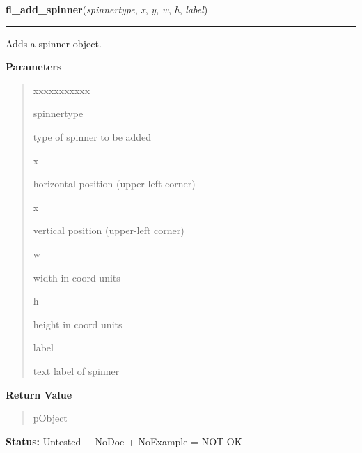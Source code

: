     \label{xformslib:library:fl_add_spinner}

    \vspace{0.5ex}

\hspace{.8\funcindent}\begin{boxedminipage}{\funcwidth}

    \raggedright \textbf{fl\_add\_spinner}(\textit{spinnertype}, \textit{x}, \textit{y}, \textit{w}, \textit{h}, \textit{label})

    \vspace{-1.5ex}

    \rule{\textwidth}{0.5\fboxrule}
\setlength{\parskip}{2ex}
    Adds a spinner object.

\setlength{\parskip}{1ex}
      \textbf{Parameters}
      \vspace{-1ex}

      \begin{quote}
        \begin{Ventry}{xxxxxxxxxxx}

          \item[spinnertype]

          type of spinner to be added

          \item[x]

          horizontal position (upper-left corner)

          \item[x]

          vertical position (upper-left corner)

          \item[w]

          width in coord units

          \item[h]

          height in coord units

          \item[label]

          text label of spinner

        \end{Ventry}

      \end{quote}

      \textbf{Return Value}
    \vspace{-1ex}

      \begin{quote}
      pObject

      \end{quote}

\textbf{Status:} Untested + NoDoc + NoExample = NOT OK



    \end{boxedminipage}


